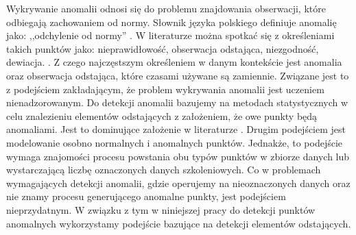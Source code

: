 Wykrywanie anomalii odnosi się do problemu znajdowania obserwacji, które odbiegają zachowaniem od normy. Słownik języka polskiego definiuje anomalię jako: ,,odchylenie od normy'' \cite{pwn}. 
W literaturze można spotkać się z określeniami takich punktów jako: nieprawidłowość, obserwacja odstająca, niezgodność, dewiacja. \cite{aggarwal2017outlier}. Z czego najczęstszym określeniem w danym kontekście jest anomalia oraz obserwacja odstająca, które czasami używane są zamiennie. Związane jest to z podejściem zakładającym, że problem wykrywania anomalii jest uczeniem nienadzorowanym. Do detekcji anomalii bazujemy na metodach statystycznych w celu znalezieniu elementów odstających z założeniem, że owe punkty będą anomaliami. Jest to dominujące założenie w literaturze \cite{emmott2015meta}. Drugim podejściem jest modelowanie osobno normalnych i anomalnych punktów. Jednakże, to podejście wymaga znajomości procesu powstania obu typów punktów w zbiorze danych lub wystarczającą liczbę oznaczonych danych szkoleniowych. Co w problemach wymagających detekcji anomalii, gdzie operujemy na nieoznaczonych danych oraz nie znamy procesu generującego anomalne punkty, jest podejściem nieprzydatnym. W związku z tym w niniejszej pracy do detekcji punktów anomalnych wykorzystamy podejście bazujące na detekcji elementów odstających.
